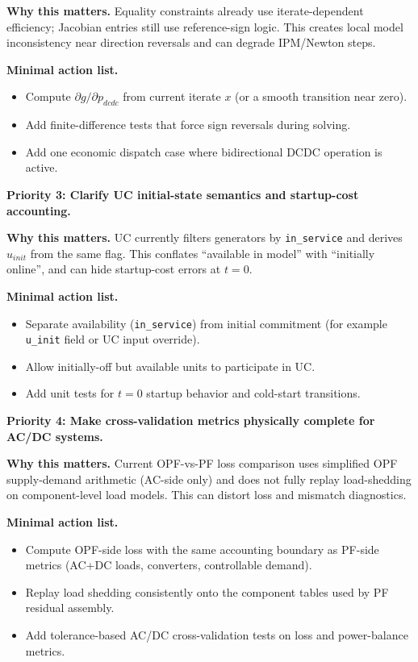 \textbf{Why this matters.} Equality constraints already use iterate-dependent
efficiency; Jacobian entries still use reference-sign logic. This creates local
model inconsistency near direction reversals and can degrade IPM/Newton steps.

\textbf{Minimal action list.}
\begin{itemize}
  \item Compute \(\partial g / \partial p_{dcdc}\) from current iterate \(x\) (or a smooth transition near zero).
  \item Add finite-difference tests that force sign reversals during solving.
  \item Add one economic dispatch case where bidirectional DCDC operation is active.
\end{itemize}

\textbf{Priority 3: Clarify UC initial-state semantics and startup-cost accounting.}

\textbf{Why this matters.} UC currently filters generators by \texttt{in\_service}
and derives \(u_{init}\) from the same flag. This conflates ``available in model''
with ``initially online'', and can hide startup-cost errors at \(t=0\).

\textbf{Minimal action list.}
\begin{itemize}
  \item Separate availability (\texttt{in\_service}) from initial commitment (for example \texttt{u\_init} field or UC input override).
  \item Allow initially-off but available units to participate in UC.
  \item Add unit tests for \(t=0\) startup behavior and cold-start transitions.
\end{itemize}

\textbf{Priority 4: Make cross-validation metrics physically complete for AC/DC systems.}

\textbf{Why this matters.} Current OPF-vs-PF loss comparison uses simplified OPF
supply-demand arithmetic (AC-side only) and does not fully replay load-shedding on
component-level load models. This can distort loss and mismatch diagnostics.

\textbf{Minimal action list.}
\begin{itemize}
  \item Compute OPF-side loss with the same accounting boundary as PF-side metrics (AC+DC loads, converters, controllable demand).
  \item Replay load shedding consistently onto the component tables used by PF residual assembly.
  \item Add tolerance-based AC/DC cross-validation tests on loss and power-balance metrics.
\end{itemize}

